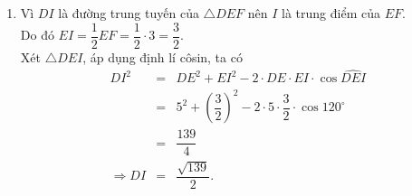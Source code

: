 \begin{bt}[1,5 điểm]
{\begin{enumerate}
			Do đó $S_{\triangle DEF} = \dfrac{1}{2}DE\cdot EF\cdot\sin\widehat{DEF} = \dfrac{1}{2}\cdot 5\cdot 3\cdot\sin 120^\circ = \dfrac{15\sqrt{3}}{4}$.\\
			Mà $S_{\triangle DEF} = pr \Rightarrow r = \dfrac{S_{\triangle DEF}}{p} = \dfrac{\dfrac{15\sqrt{3}}{4}}{\dfrac{15}{2}} = \dfrac{\sqrt{3}}{2} \approx 0{,}87$.\\
			Vậy bán kính đường tròn nội tiếp tam giác $DEF$ gần bằng $0{,}87$.
			\item Vì $DI$ là đường trung tuyến của $\triangle DEF$ nên $I$ là trung điểm của $EF$.\\
			Do đó $EI = \dfrac{1}{2}EF = \dfrac{1}{2}\cdot 3 = \dfrac{3}{2}$.\\
			Xét $\triangle DEI$, áp dụng định lí côsin, ta có
			\begin{eqnarray*}
				DI^2 &=& DE^2 + EI^2 - 2\cdot DE\cdot EI\cdot\cos\widehat{DEI}\\
				&=& 5^2 + \left(\dfrac{3}{2}\right)^2 - 2\cdot 5\cdot \dfrac{3}{2}\cdot \cos 120^\circ\\
				&=& \dfrac{139}{4}\\
				\Rightarrow DI &=& \dfrac{\sqrt{139}}{2}.
			\end{eqnarray*}
		\end{enumerate}
	}
\end{bt}

